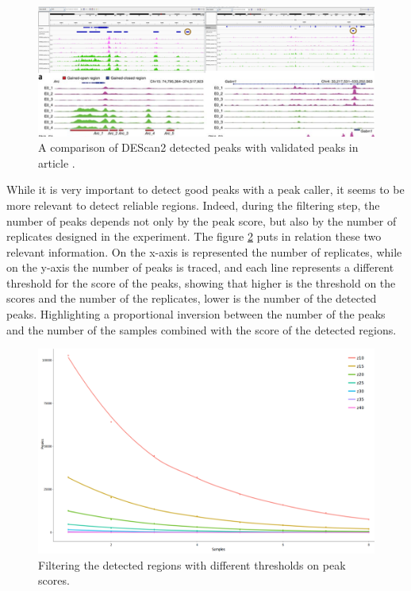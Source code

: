 \begin{figure}[H]
\includegraphics[width=\textwidth,height=\textheight,keepaspectratio]{img/descan2/peaks.png}
\caption[DEScan2 peaks detection]{A comparison of DEScan2 detected peaks with validated peaks in article \cite{Su2017}.}
\label{fig:peaksdescan}
\centering
\end{figure}

While it is very important to detect good peaks with a peak caller, it seems to be more relevant to detect reliable regions. Indeed, during the filtering step, the number of peaks depends not only by the peak score, but also by the number of replicates designed in the experiment.
The figure \ref{fig:filteringdescan} puts in relation these two relevant information. 
On the x-axis is represented the number of replicates, while on the y-axis the number of peaks is traced, and each line represents a different threshold for the score of the peaks, showing that higher is the threshold on the scores and the number of the replicates, lower is the number of the detected peaks.
Highlighting a proportional inversion between the number of the peaks and the number of the samples combined with the score of the detected regions.


\begin{figure}[H]
\includegraphics[width=\textwidth, height=\textheight, keepaspectratio]{img/descan2/filtering.png}
\caption[DEScan2 filtering step]{Filtering the detected regions with different thresholds on peak scores.}
\label{fig:filteringdescan}
\centering
\end{figure}

